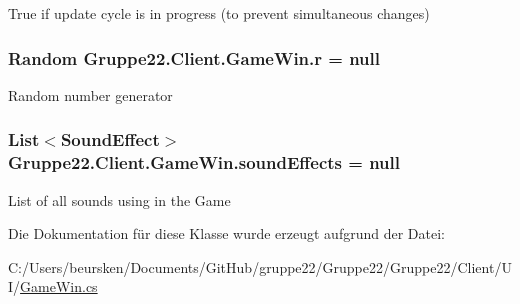 True if update cycle is in progress (to prevent simultaneous changes) 

\hypertarget{class_gruppe22_1_1_client_1_1_game_win_af055bbaf549bd421da7f23068e009a10}{
\subsubsection[{r}]{\setlength{\rightskip}{0pt plus 5cm}Random Gruppe22.\-Client.\-Game\-Win.\-r = null\hspace{0.3cm}{\ttfamily [protected]}}}\label{class_gruppe22_1_1_client_1_1_game_win_af055bbaf549bd421da7f23068e009a10}


Random number generator 

\hypertarget{class_gruppe22_1_1_client_1_1_game_win_a6763784b1678d11b7930be1dbcedc12e}{
\subsubsection[{sound\-Effects}]{\setlength{\rightskip}{0pt plus 5cm}List$<$Sound\-Effect$>$ Gruppe22.\-Client.\-Game\-Win.\-sound\-Effects = null\hspace{0.3cm}{\ttfamily [protected]}}}\label{class_gruppe22_1_1_client_1_1_game_win_a6763784b1678d11b7930be1dbcedc12e}


List of all sounds using in the Game 



Die Dokumentation für diese Klasse wurde erzeugt aufgrund der Datei\-:\begin{DoxyCompactItemize}
\item 
C\-:/\-Users/beursken/\-Documents/\-Git\-Hub/gruppe22/\-Gruppe22/\-Gruppe22/\-Client/\-U\-I/\hyperlink{_game_win_8cs}{Game\-Win.\-cs}\end{DoxyCompactItemize}
